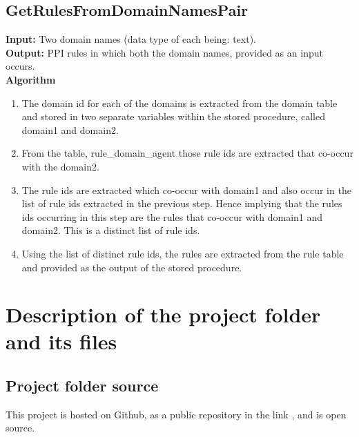 \documentclass[msc,deptreport,ai]{infthesis}      %
\begin{document}
 \subsection{GetRulesFromDomainNamesPair}
  \textbf{Input:} Two domain names (data type of each being: text).\\
 \textbf{Output:} PPI rules in which both the domain names, provided as an input occurs.\\ 
 \textbf{Algorithm}
  \begin{enumerate}
 \item  The domain id for each of the domains is extracted from the domain table and stored in two separate variables within the stored procedure, called domain1 and domain2. 
\item  From the table, rule\_domain\_agent those rule ids are extracted that co-occur with the domain2.
\item  The rule ids are extracted which co-occur with domain1 and also occur in the list of rule ids extracted in the previous step. Hence implying that the rules ids occurring in this step are the rules that co-occur with domain1 and domain2. This is a distinct list of rule ids. 
\item Using the list of distinct rule ids, the rules are extracted from the rule table and provided as the output of the stored procedure.
 \end{enumerate}
\section{Description of the project folder and its files}
\subsection{Project folder source}
This project is hosted on Github, as a public repository in the link \cite{sourceCode}, and is open source.
\end{document}
